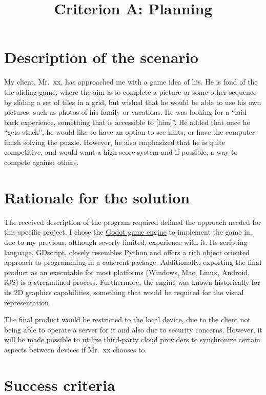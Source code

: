 \documentclass[12pt]{article}
\begin{document}
\title{Criterion A: Planning\vspace{-3em}}
\date{}
\author{}

\maketitle

\section{Description of the scenario}

My client, Mr.\ xx, has approached me with a game idea of his. He is fond of
the tile sliding game, where the aim is to complete a picture or some other
sequence by sliding a set
of tiles in a grid, but wished that he would be able to use his own pictures,
such as photos of his family or vacations. He was looking for a ``laid back
experience, something that is accessible to [him]''. He added that once he ``gets
stuck'', he would like to have an option to see hints, or have the computer
finish solving the puzzle. However, he also emphasized that he is quite
competitive, and would want a high score system and if possible, a way to
compete against others.

\section{Rationale for the solution}

The received description of the program required defined the approach needed for
this specific project. I chose the \href{https://godotengine.org/}{Godot game
engine} to implement the game in, due to my previous, although severly limited,
experience with it. Its scripting language, GDscript, closely resembles Python
and offers a rich object oriented approach to programming in a coherent package.
Additionally, exporting the final product as an executable for most platforms
(Windows, Mac, Linux, Android, iOS) is a streamlined process. Furthermore, the
engine was known historically for its 2D graphics capabilities, something that
would be required for the visual representation.

The final product would be restricted to the local device, due to the client
not being able to operate a server for it and also due to security concerns.
However, it will be made possible to utilize third-party cloud providers to
synchronize certain aspects between devices if Mr.\ xx chooses to.

\section{Success criteria}


\end{document}
